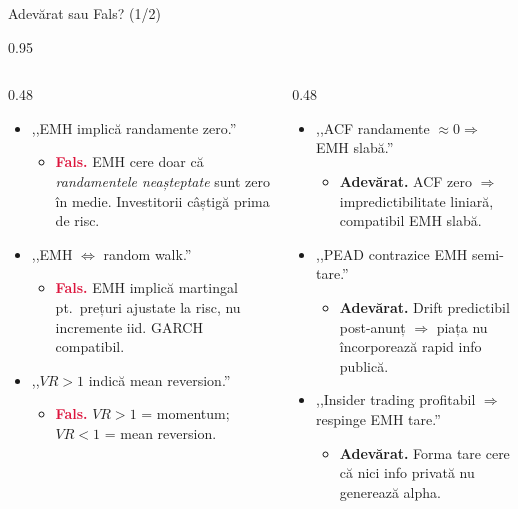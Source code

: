 \documentclass[9pt, aspectratio=169, t]{beamer}
\begin{document}
\begin{frame}[shrink=15]{Adevărat sau Fals? (1/2)}
\begin{cminipage}{0.95\textwidth}
\begin{columns}[T]
\begin{column}{0.48\textwidth}
\begin{itemize}\setlength{\itemsep}{1pt}
    \item ,,EMH implică randamente zero.''
    \begin{itemize}\setlength{\itemsep}{0pt}
        \item[] \textcolor{Crimson}{\textbf{Fals.}} EMH cere doar că \emph{randamentele neașteptate} sunt zero în medie. Investitorii câștigă prima de risc.
    \end{itemize}
    \item ,,EMH $\Leftrightarrow$ random walk.''
    \begin{itemize}\setlength{\itemsep}{0pt}
        \item[] \textcolor{Crimson}{\textbf{Fals.}} EMH implică martingal pt.\ prețuri ajustate la risc, nu incremente iid. GARCH compatibil.
    \end{itemize}
    \item ,,$VR > 1$ indică mean reversion.''
    \begin{itemize}\setlength{\itemsep}{0pt}
        \item[] \textcolor{Crimson}{\textbf{Fals.}} $VR > 1$ = momentum; $VR < 1$ = mean reversion.
    \end{itemize}
\end{itemize}
\end{column}
\begin{column}{0.48\textwidth}
\begin{itemize}\setlength{\itemsep}{1pt}
    \item ,,ACF randamente $\approx 0 \Rightarrow$ EMH slabă.''
    \begin{itemize}\setlength{\itemsep}{0pt}
        \item[] \textcolor{Forest}{\textbf{Adevărat.}} ACF zero $\Rightarrow$ impredictibilitate liniară, compatibil EMH slabă.
    \end{itemize}
    \item ,,PEAD contrazice EMH semi-tare.''
    \begin{itemize}\setlength{\itemsep}{0pt}
        \item[] \textcolor{Forest}{\textbf{Adevărat.}} Drift predictibil post-anunț $\Rightarrow$ piața nu încorporează rapid info publică.
    \end{itemize}
    \item ,,Insider trading profitabil $\Rightarrow$ respinge EMH tare.''
    \begin{itemize}\setlength{\itemsep}{0pt}
        \item[] \textcolor{Forest}{\textbf{Adevărat.}} Forma tare cere că nici info privată nu generează alpha.
    \end{itemize}
\end{itemize}
\end{column}
\end{columns}
\end{cminipage}
\end{frame}
\end{document}
